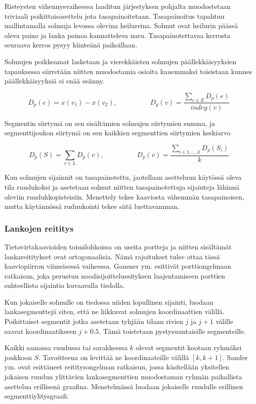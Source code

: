 \documentclass[finnish,12pt]{article}
\begin{document}
Risteysten vähennysvaiheessa laaditun järjestyksen pohjalta muodostetaan triviaali poikittaisasettelu jota tasapainoitetaan.
Tasapainoitus tapahtuu mallintamalla solmuja levossa olevina heilureina.
Solmut ovat heilurin päässä oleva paino ja lanka painoa kannatteleva naru.
Tasapainotettavaa kerrosta seuraava kerros pysyy kiinteänä paikoillaan.

Solmujen poikkeamat lasketaan ja vierekkäisten solmujen päällekkäisyyksien tapauksessa siirretään niitten muodostamia osioita kauemmaksi toisistaan kunnes päällekkäisyyksiä ei enää esiinny.

$$
D_p(e)=x(v_1)-x(v_2), \hspace{2cm} D_p(v)=\frac{\sum_{e \in E}D_p(e)}{indeg(v)}
$$

Segmentin siirtymä on sen sisältämien solmujen siirtymien summa, ja segmenttijoukon siirtymä on sen kaikkien segmenttien siirtymien keskiarvo

$$
D_p(S)=\sum_{v \in L} D_p(v),\hspace{2cm} D_p(v)=\frac{\sum_{i \in {1,...,k}}D_p(S_i)}{k}
$$


Kun solmujen sijainnit on tasapainotettu, jaotellaan asetteluun käytössä oleva tila ruudukoksi ja asetetaan solmut niitten tasapainotettuja sijainteja lähinnä oleviin ruudukkopisteisiin.
Menettely tekee kaaviosta vähemmän tasapainoisen, mutta käytännössä ruduukointi tekee siitä luettavamman.

		\subsubsection{Lankojen reititys}

Tietovirtakaavioiden toimilohkoissa on useita portteja ja niitten sisältämät lankareititykset ovat ortogonaalisia.
Nämä rajoitukset tulee ottaa tässä kaaviopiirron viimeisessä vaiheessa.
Gansner ym. esittivät porttiongelmaan ratkaisun, joka perustuu noodisijoitteluesityksen laajentamiseen porttien suhteellista sijaintia kuvaavalla tiedolla.\cite{RefWorks:28}

Kun jokaiselle solmulle on tiedossa niiden lopullinen sijainti, luodaan lankasegmenttejä siten, että ne liikkuvat solmujen koordinaattien välillä.
Poikittaiset segmentit jotka asetetaan tyhjään tilaan rivien $j$ ja $j+1$ välille saavat koordinaatikseen $j+0.5$.
Tämä toistetaan pystysuuntaisille segmenteille.

Kaikki samassa ruudussa tai sarakkeessa $k$ olevat segmentit kootaan ryhmäksi joukkoon $S$.
Tavoitteena on levittää ne koordinaateille välillä $[k, k+1]$.
Sander ym. ovat esittäneet reititysongelman ratkaisun, jossa käsitellään yksitellen jokaisen ruudun ylittävien lankasegmenttien muodostaman ryhmän paikallista asettelua erillisenä graafina. \cite{RefWorks:17}
Menetelmässä luodaan jokaiselle ruudulle erillinen segmenttiylitysgraafi.
\end{document}
